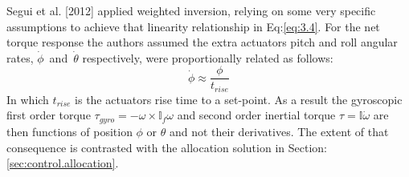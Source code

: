 \par
Segui et al. [2012] applied weighted inversion, relying on some very specific assumptions to achieve that linearity relationship in Eq:\ref{eq:3.4}. For the net torque response the authors assumed the extra actuators pitch and roll angular rates, $\dot{\phi}$~and~$\dot{\theta}$ respectively, were proportionally related as follows:
\begin{equation}
\dot{\phi}\approx\frac{\phi}{t_{rise}}
\end{equation}
In which $t_{rise}$ is the actuators rise time to a set-point. As a result the gyroscopic first order torque $\tau_{gyro}=-\omega\times\mathbb{I}_f\omega$ and second order inertial torque $\tau=\mathbb{I}\dot{\omega}$ are then functions of position $\phi$ or $\theta$ and not their derivatives. The extent of that consequence is contrasted with the allocation solution in Section:\ref{sec:control.allocation}.
